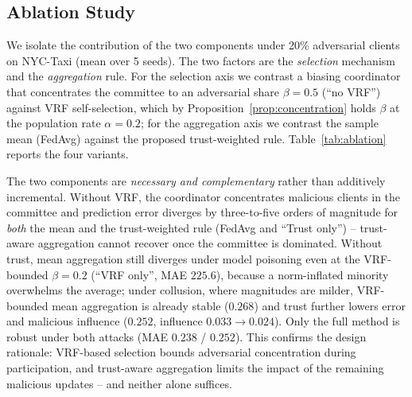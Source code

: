 \subsection{Ablation Study}

We isolate the contribution of the two components under 20\% adversarial
clients on NYC-Taxi (mean over 5 seeds). The two factors are the
\emph{selection} mechanism and the \emph{aggregation} rule. For the selection
axis we contrast a biasing coordinator that concentrates the committee to an
adversarial share $\beta=0.5$ (``no VRF'') against VRF self-selection, which by
Proposition~\ref{prop:concentration} holds $\beta$ at the population rate
$\alpha=0.2$; for the aggregation axis we contrast the sample mean (FedAvg)
against the proposed trust-weighted rule. Table~\ref{tab:ablation} reports the
four variants.

The two components are \emph{necessary and complementary} rather than additively
incremental. Without VRF, the coordinator concentrates malicious clients in the
committee and prediction error diverges by three-to-five orders of magnitude for
\emph{both} the mean and the trust-weighted rule (FedAvg and ``Trust only'') --
trust-aware aggregation cannot recover once the committee is dominated. Without
trust, mean aggregation still diverges under model poisoning even at the
VRF-bounded $\beta=0.2$ (``VRF only'', MAE $225.6$), because a norm-inflated
minority overwhelms the average; under collusion, where magnitudes are milder,
VRF-bounded mean aggregation is already stable ($0.268$) and trust further lowers
error and malicious influence ($0.252$, influence $0.033\!\to\!0.024$). Only the
full method is robust under both attacks (MAE $0.238$ / $0.252$). This confirms
the design rationale: VRF-based selection bounds adversarial concentration during
participation, and trust-aware aggregation limits the impact of the remaining
malicious updates -- and neither alone suffices.

